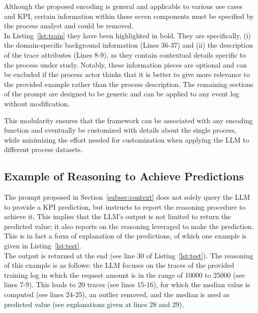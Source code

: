 \documentclass[manuscript,screen,review]{acmart}
\begin{document}
Although the proposed encoding is general and applicable to various use cases and KPI, certain information within these seven components must be specified by the process analyst and could be removed. 
\\
 

In Listing~\ref{lst:train} they have been highlighted in bold. They are specifically, (i) the domain-specific background information (Lines 36-37) and (ii) the description of the trace attributes (Lines 8-9), as they contain contextual details specific to the process under study.
Notably, these information pieces are optional and can be excluded if the process actor thinks that it is better to give more relevance to the provided example rather than the process description. The remaining sections of the prompt are designed to be generic and can be applied to any event log without modification.

This modularity ensures that the framework can be associated with any encoding function and eventually be customized with details about the single process, while minimizing the effort needed for customization when applying the LLM to different process datasets. 

\subsection{Example of Reasoning to Achieve Predictions}\label{subsec:explain}

The prompt proposed in Section~\ref{subsec:context} does not solely query the LLM to provide a KPI prediction, but instructs to report the reasoning procedure to achieve it. This implies that the LLM's output is not limited to return the predicted value: it also reports on the reasoning leveraged to make the prediction. This is in fact a form of explanation of the predictions, of which one example is given in Listing~\ref{lst:test}.
\\



The output is returned at the end (see line 30 of Listing~\ref{lst:test}). The reasoning of this example is as follows: the LLM focuses on the traces of the provided training log in which the request amount is in the range of 10000 to 25000 (see lines 7-9). This leads to 20 traces (see lines 15-16), for which the median value is computed (see lines 24-25), an outlier removed, and the median is used as predicted value (see explanations given at lines 28 and 29). 
\end{document}
